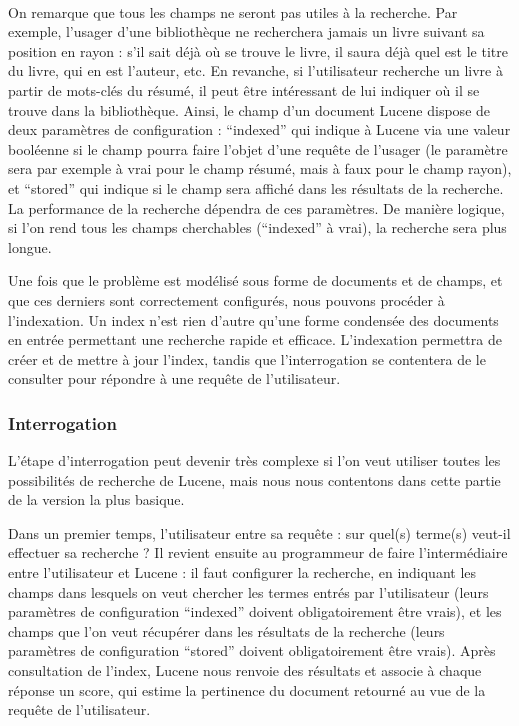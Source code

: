 ~~\\
On remarque que tous les champs ne seront pas utiles à la recherche. Par exemple, l’usager d’une bibliothèque ne recherchera jamais un livre suivant sa position en rayon : s’il sait déjà où se trouve le livre, il saura déjà quel est le titre du livre, qui en est l’auteur, etc. En revanche, si l’utilisateur recherche un livre à partir de mots-clés du résumé, il peut être intéressant de lui indiquer où il se trouve dans la bibliothèque. Ainsi, le champ d’un document Lucene dispose de deux paramètres de configuration : “indexed” qui indique à Lucene via une valeur booléenne si le champ pourra faire l’objet d’une requête de l’usager (le paramètre sera par exemple à vrai pour le champ résumé, mais à faux pour le champ rayon), et “stored” qui indique si le champ sera affiché dans les résultats de la recherche. La performance de la recherche dépendra de ces paramètres. De manière logique, si l’on rend tous les champs cherchables (“indexed” à vrai), la recherche sera plus longue.

Une fois que le problème est modélisé sous forme de documents et de champs, et que ces derniers sont correctement configurés, nous pouvons procéder à l’indexation. Un index n’est rien d’autre qu’une forme condensée des documents en entrée permettant une recherche rapide et efficace. L’indexation permettra de créer et de mettre à jour l’index, tandis que l’interrogation se contentera de le consulter pour répondre à une requête de l’utilisateur.

\subsubsection{Interrogation}

L’étape d’interrogation peut devenir très complexe si l’on veut utiliser toutes les possibilités de recherche de Lucene, mais nous nous contentons dans cette partie de la version la plus basique.

Dans un premier temps, l’utilisateur entre sa requête : sur quel(s) terme(s) veut-il effectuer sa recherche ? Il revient ensuite au programmeur de faire l’intermédiaire entre l’utilisateur et Lucene : il faut configurer la recherche, en indiquant les champs dans lesquels on veut chercher les termes entrés par l’utilisateur (leurs paramètres de configuration “indexed” doivent obligatoirement être vrais), et les champs que l’on veut récupérer dans les résultats de la recherche (leurs paramètres de configuration “stored” doivent obligatoirement être vrais). Après consultation de l’index, Lucene nous renvoie des résultats et associe à chaque réponse un score, qui estime la pertinence du document retourné au vue de la requête de l’utilisateur.

